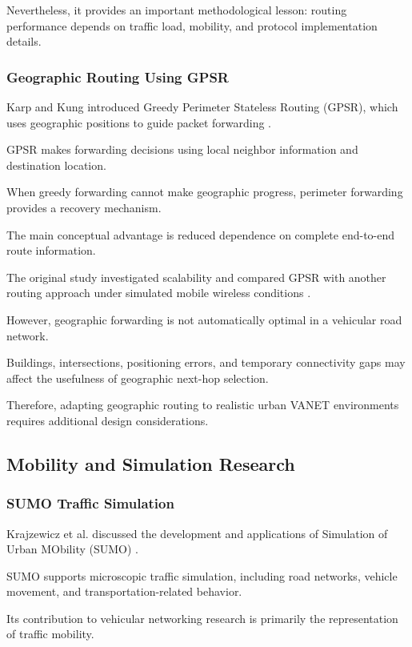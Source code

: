 Nevertheless, it provides
an important methodological
lesson: routing performance
depends on traffic load,
mobility, and protocol
implementation details.

\subsubsection{Geographic Routing Using GPSR}

Karp and Kung introduced
Greedy Perimeter Stateless
Routing (GPSR), which uses
geographic positions to
guide packet forwarding
\cite{Karp2000}.

GPSR makes forwarding
decisions using local
neighbor information
and destination location.

When greedy forwarding
cannot make geographic
progress, perimeter
forwarding provides
a recovery mechanism.

The main conceptual
advantage is reduced
dependence on complete
end-to-end route
information.

The original study
investigated scalability
and compared GPSR
with another routing
approach under simulated
mobile wireless
conditions \cite{Karp2000}.

However, geographic
forwarding is not
automatically optimal
in a vehicular road
network.

Buildings, intersections,
positioning errors, and
temporary connectivity
gaps may affect the
usefulness of geographic
next-hop selection.

Therefore, adapting
geographic routing
to realistic urban
VANET environments
requires additional
design considerations.

\subsection{Mobility and Simulation Research}

\subsubsection{SUMO Traffic Simulation}

Krajzewicz et al. discussed
the development and
applications of Simulation
of Urban MObility (SUMO)
\cite{Krajzewicz2012}.

SUMO supports microscopic
traffic simulation,
including road networks,
vehicle movement, and
transportation-related
behavior.

Its contribution to
vehicular networking
research is primarily
the representation of
traffic mobility.

